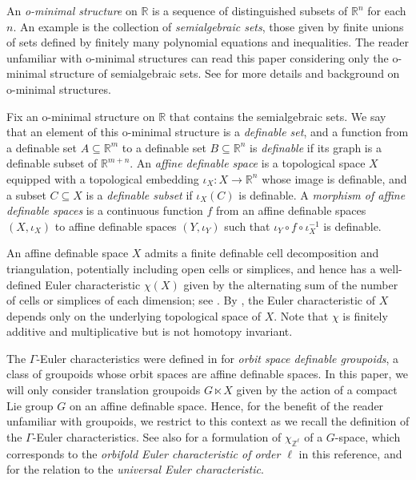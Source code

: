 \documentclass[twoside]{amsart}
\theoremstyle{definition}
\theoremstyle{remark}
\numberwithin{equation}{section}
\newcommand{\R}{\mathbb{R}}
\newcommand{\Z}{\mathbb{Z}}
\begin{document}
An \emph{o-minimal structure} on $\R$ is a sequence of distinguished subsets of $\R^n$ for each $n$. An example is the collection of \emph{semialgebraic sets},
those given by finite unions of sets defined by finitely many polynomial equations and inequalities. The reader unfamiliar with o-minimal structures
can read this paper considering only the o-minimal structure of semialgebraic sets. See \cite{vandenDriesBook} for more details and background on o-minimal structures.

Fix an o-minimal structure on $\R$ that contains the semialgebraic sets. We say that an element of this o-minimal structure is a \emph{definable set},
and a function from a definable set $A\subseteq\R^m$ to a definable set $B\subseteq\R^n$ is \emph{definable} if its graph is a definable subset of $\R^{m + n}$.
An \emph{affine definable space} is a topological space $X$ equipped with a topological embedding $\iota_X\colon X\to \R^n$ whose image is definable,
and a subset $C\subseteq X$ is a \emph{definable subset} if $\iota_X(C)$ is definable. A \emph{morphism of affine definable spaces} is a continuous function $f$
from an affine definable spaces $(X,\iota_X)$ to affine definable spaces $(Y, \iota_Y)$ such that $\iota_Y\circ f\circ\iota_X^{-1}$ is definable. 

An affine definable space $X$ admits a finite definable cell decomposition and triangulation, potentially including open cells or simplices,
and hence has a well-defined Euler characteristic $\chi(X)$ given by the alternating sum of the number of cells or simplices of each
dimension; see \cite[Ch.~3, 4, 8]{vandenDriesBook}. By \cite[Thrm.~2.2]{BekeInvarEC}, the Euler characteristic of $X$ depends only on the underlying topological space
of $X$. Note that $\chi$ is finitely additive and multiplicative but is not homotopy invariant.

The $\Gamma$-Euler characteristics were defined in \cite{FarSeaJLMS} for \emph{orbit space definable groupoids}, a class of groupoids whose orbit spaces are affine
definable spaces. In this paper, we will only consider translation groupoids $G\ltimes X$ given by the action of a compact Lie group $G$ on an affine definable space.
Hence, for the benefit of the reader unfamiliar with groupoids, we restrict to this context as we recall the definition of the $\Gamma$-Euler characteristics.
See also \cite[Def.~2.1 and 2.2]{G-ZLM-Hcompact} for a formulation of $\chi_{\Z^\ell}$ of a $G$-space, which corresponds to the
\emph{orbifold Euler characteristic of order $\ell$} in this reference, and \cite[Sec.~4]{FarsiProctorSeatonBurnside} for the relation to the \emph{universal
Euler characteristic}.
\end{document}
